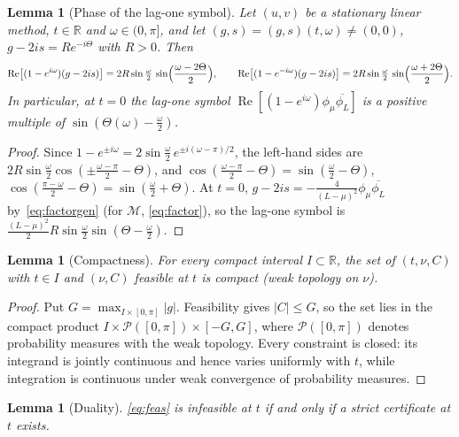 \documentclass[11pt]{article}
\newtheorem{lemma}[theorem]{Lemma}
\theoremstyle{definition}
\theoremstyle{remark}
\newcommand{\R}{\mathbb R}
\newcommand{\cM}{\mathcal M}
\newcommand{\Rea}{\operatorname{Re}}
\begin{document}
\begin{lemma}[Phase of the lag-one symbol]\label{lem:angle}
Let \((u,v)\) be a stationary linear method, \(t\in\R\) and \(\omega\in(0,\pi]\), and let \((g,s)=(g,s)(t,\omega)\ne(0,0)\),
\(g-2is=Re^{-i\Theta}\) with \(R>0\).  Then
\begin{equation}\label{eq:defect}
\Rea\bigl[(1-e^{i\omega})(g-2is)\bigr]=2R\sin\tfrac\omega2\,\sin\Bigl(\frac{\omega-2\Theta}2\Bigr),\qquad
\Rea\bigl[(1-e^{-i\omega})(g-2is)\bigr]=2R\sin\tfrac\omega2\,\sin\Bigl(\frac{\omega+2\Theta}2\Bigr).
\end{equation}
In particular, at \(t=0\) the lag-one symbol \(\Rea[(1-e^{i\omega})\phi_\mu\overline{\phi_L}]\) is a positive multiple of
\(\sin(\Theta(\omega)-\frac\omega2)\).
\end{lemma}

\begin{proof}
Since \(1-e^{\pm i\omega}=2\sin\frac\omega2\,e^{\pm i(\omega-\pi)/2}\), the left-hand sides are \(2R\sin\frac\omega2\cos(\pm\frac{\omega-\pi}2-\Theta)\),
and \(\cos(\frac{\omega-\pi}2-\Theta)=\sin(\frac\omega2-\Theta)\), \(\cos(\frac{\pi-\omega}2-\Theta)=\sin(\frac\omega2+\Theta)\).  At \(t=0\),
\(g-2is=-\frac4{(L-\mu)^2}\phi_\mu\overline{\phi_L}\) by~\eqref{eq:factorgen} (for \(\cM\), \eqref{eq:factor}), so the lag-one symbol is
\(\frac{(L-\mu)^2}2R\sin\frac\omega2\sin(\Theta-\frac\omega2)\).
\end{proof}

\begin{lemma}[Compactness]\label{lem:compact}
For every compact interval \(I\subset\R\), the set of \((t,\nu,C)\) with \(t\in I\) and
\((\nu,C)\) feasible at \(t\) is compact (weak topology on \(\nu\)).
\end{lemma}

\begin{proof}
Put \(G=\max_{I\times[0,\pi]}|g|\).  Feasibility gives \(|C|\le G\), so the set lies in the
compact product \(I\times\mathcal P([0,\pi])\times[-G,G]\), where
\(\mathcal P([0,\pi])\) denotes probability measures with the weak topology.
Every constraint is closed: its integrand is jointly continuous and hence varies uniformly with \(t\),
while integration is continuous under weak convergence of probability measures.
\end{proof}

\begin{lemma}[Duality]\label{lem:duality}
\eqref{eq:feas} is infeasible at \(t\) if and only if a strict certificate
at \(t\) exists.
\end{lemma}
\end{document}
